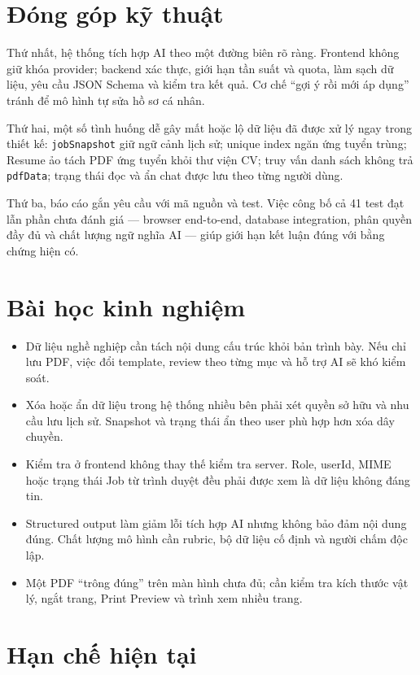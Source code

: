 \section{Đóng góp kỹ thuật}

Thứ nhất, hệ thống tích hợp AI theo một đường biên rõ ràng. Frontend không giữ khóa provider; backend xác thực, giới hạn tần suất và quota, làm sạch dữ liệu, yêu cầu JSON Schema và kiểm tra kết quả. Cơ chế ``gợi ý rồi mới áp dụng'' tránh để mô hình tự sửa hồ sơ cá nhân.

Thứ hai, một số tình huống dễ gây mất hoặc lộ dữ liệu đã được xử lý ngay trong thiết kế: \texttt{jobSnapshot} giữ ngữ cảnh lịch sử; unique index ngăn ứng tuyển trùng; Resume ảo tách PDF ứng tuyển khỏi thư viện CV; truy vấn danh sách không trả \texttt{pdfData}; trạng thái đọc và ẩn chat được lưu theo từng người dùng.

Thứ ba, báo cáo gắn yêu cầu với mã nguồn và test. Việc công bố cả 41 test đạt lẫn phần chưa đánh giá --- browser end-to-end, database integration, phân quyền đầy đủ và chất lượng ngữ nghĩa AI --- giúp giới hạn kết luận đúng với bằng chứng hiện có.

\section{Bài học kinh nghiệm}

\begin{itemize}
    \item Dữ liệu nghề nghiệp cần tách nội dung cấu trúc khỏi bản trình bày. Nếu chỉ lưu PDF, việc đổi template, review theo từng mục và hỗ trợ AI sẽ khó kiểm soát.
    \item Xóa hoặc ẩn dữ liệu trong hệ thống nhiều bên phải xét quyền sở hữu và nhu cầu lưu lịch sử. Snapshot và trạng thái ẩn theo user phù hợp hơn xóa dây chuyền.
    \item Kiểm tra ở frontend không thay thế kiểm tra server. Role, userId, MIME hoặc trạng thái Job từ trình duyệt đều phải được xem là dữ liệu không đáng tin.
    \item Structured output làm giảm lỗi tích hợp AI nhưng không bảo đảm nội dung đúng. Chất lượng mô hình cần rubric, bộ dữ liệu cố định và người chấm độc lập.
    \item Một PDF ``trông đúng'' trên màn hình chưa đủ; cần kiểm tra kích thước vật lý, ngắt trang, Print Preview và trình xem nhiều trang.
\end{itemize}

\section{Hạn chế hiện tại}

